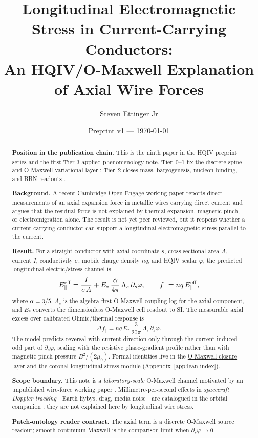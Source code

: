 \documentclass[11pt]{amsart}
\title[Longitudinal EM Stress in Conductors]{Longitudinal Electromagnetic Stress in Current-Carrying Conductors:\\
An HQIV/O-Maxwell Explanation of Axial Wire Forces}
\author{Steven Ettinger Jr}
\date{Preprint v1 --- \today}
\begin{document}
\begin{abstract}
\noindent\textbf{Position in the publication chain.}
This is the ninth paper in the HQIV preprint series and the
first Tier-3 applied phenomenology note. Tier~0--1 fix the discrete spine
and O-Maxwell variational layer
\cite{ettinger2026hqiv,hqiv-lightcone-paper,hqiv-so8-paper,hqiv-3d-growth-paper,hqiv-oct-action-paper,hqiv-kirchhoff-paper};
Tier~2 closes mass, baryogenesis, nucleon binding, and BBN readouts
\cite{hqiv-tuft-sm-lagrangian-paper,hqiv-baryogenesis-paper,hqiv-nucleon-binding-paper,hqiv-bbn-paper}.

\noindent\textbf{Background.}
A recent Cambridge Open Engage working paper \cite{graneau2026} reports direct
measurements of an axial expansion force in metallic wires carrying direct
current and argues that the residual force is not explained by thermal
expansion, magnetic pinch, or electromigration alone. The result is not yet
peer reviewed, but it reopens whether a current-carrying conductor can
support a longitudinal electromagnetic stress parallel to the current.

\noindent\textbf{Result.}
For a straight conductor with axial coordinate $s$, cross-sectional area $A$,
current $I$, conductivity $\sigma$, mobile charge density $nq$, and HQIV scalar
$\varphi$, the predicted longitudinal electric/stress channel is
\[
E_{\parallel}^{\rm eff}
  = \frac{I}{\sigma A}
  + E_\ast\,\frac{\alpha}{4\pi}\,\Lambda_s\,\partial_s\varphi,
\qquad
f_{\parallel}
  = nq\,E_{\parallel}^{\rm eff},
\]
where $\alpha=3/5$, $\Lambda_s$ is the algebra-first O-Maxwell coupling log for
the axial component, and $E_\ast$ converts the dimensionless O-Maxwell cell
readout to SI. The measurable axial excess over calibrated Ohmic/thermal response is
\[
\Delta f_{\parallel}
  = nq\,E_\ast\,\frac{3}{20\pi}\,\Lambda_s\,\partial_s\varphi .
\]
The model predicts reversal with current direction only through the
current-induced odd part of $\partial_s\varphi$, scaling with the resistive
phase-gradient profile rather than with magnetic pinch pressure
$B^2/(2\mu_0)$. Formal identities live in the
\hyperref[lean:o-maxwell-closure]{O-Maxwell closure layer} and the
\hyperref[lean:coronal-longitudinal]{coronal longitudinal stress module}
(Appendix~\ref{app:lean-index}).

\noindent\textbf{Scope boundary.}
This note is a \emph{laboratory-scale} O-Maxwell channel motivated by an unpublished
wire-force working paper \cite{graneau2026}. Millimetre-per-second effects in
\emph{spacecraft Doppler tracking}---Earth flybys, drag, media noise---are catalogued
in the orbital companion \cite{hqiv-flyby-paper}; they are not explained here by
longitudinal wire stress.

\noindent\textbf{Patch-ontology reader contract.}
The axial term is a discrete O-Maxwell source readout; smooth continuum
Maxwell is the comparison limit when $\partial_s\varphi\to 0$.
\end{abstract}
\maketitle
\end{document}
